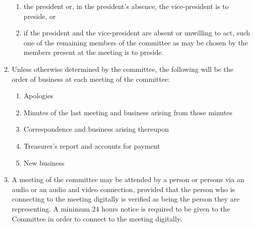 \begin{enumerate}
\begin{enumerate}
    \item the president or, in the president’s absence, the vice-president is to preside, or
    \item if the president and the vice-president are absent or unwilling to act, such one of the remaining members of the committee as may be chosen by the members present at the meeting is to preside.
  \end{enumerate}
\item Unless otherwise determined by the committee, the following will be the order of business at each meeting of the committee:
  \begin{enumerate}
    \item Apologies
    \item Minutes of the last meeting and business arising from those minutes
    \item Correspondence and business arising thereupon
    \item Treasurer’s report and accounts for payment
    \item New business
  \end{enumerate}
\item\label{digial-attendance} A meeting of the committee may be attended by a person or persons via an audio or an audio and video connection, provided that the person who is connecting to the meeting digitally is verified as being the person they are representing. A minimum 24 hours notice is required to be given to the Committee in order to connect to the meeting digitally.
\end{enumerate}

